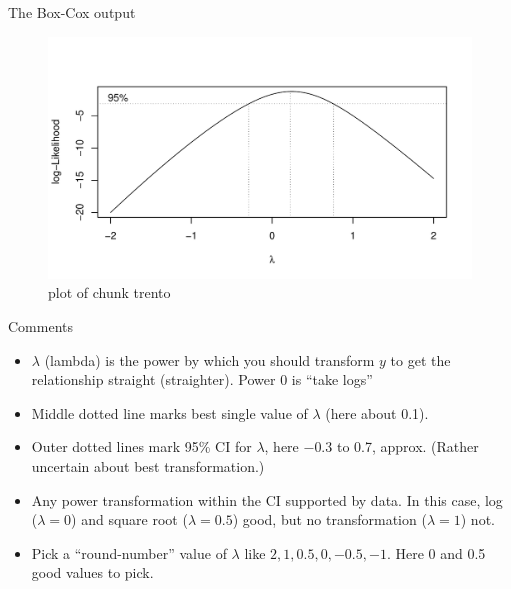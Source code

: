 \documentclass[ignorenonframetext,]{beamer}
\begin{document}
\begin{frame}{The Box-Cox output}
\protect\hypertarget{the-box-cox-output}{}

\begin{figure}
\centering
\includegraphics{figure/trento-1.pdf}
\caption{plot of chunk trento}
\end{figure}

\end{frame}

\begin{frame}{Comments}
\protect\hypertarget{comments-2}{}

\begin{itemize}
\item
  \(\lambda\) (lambda) is the power by which you should transform \(y\)
  to get the relationship straight (straighter). Power 0 is ``take
  logs''
\item
  Middle dotted line marks best single value of \(\lambda\) (here about
  0.1).
\item
  Outer dotted lines mark 95\% CI for \(\lambda\), here \(-0.3\) to 0.7,
  approx. (Rather uncertain about best transformation.)
\item
  Any power transformation within the CI supported by data. In this
  case, log (\(\lambda=0\)) and square root (\(\lambda=0.5\)) good, but
  no transformation (\(\lambda=1\)) not.
\item
  Pick a ``round-number'' value of \(\lambda\) like
  \(2,1,0.5,0,-0.5,-1\). Here 0 and 0.5 good values to pick.
\end{itemize}

\end{frame}
\end{document}
